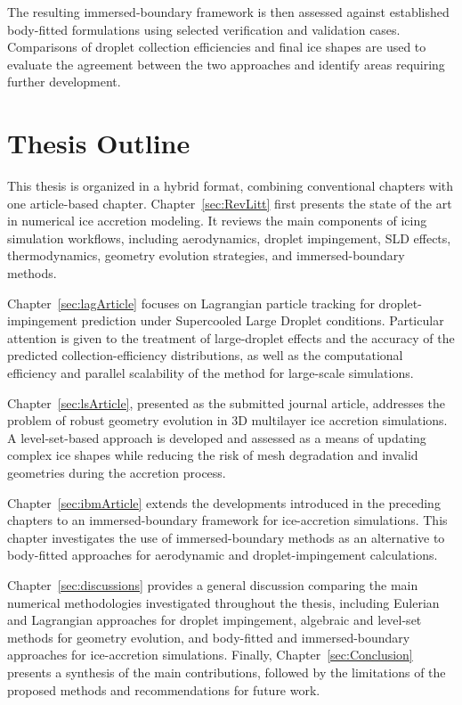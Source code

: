 The resulting immersed-boundary framework is then assessed against established body-fitted formulations using selected verification and validation cases.
Comparisons of droplet collection efficiencies and final ice shapes are used to evaluate the agreement between the two approaches and identify areas requiring further development.

\section{Thesis Outline}

This thesis is organized in a hybrid format, combining conventional chapters with one article-based chapter. Chapter~\ref{sec:RevLitt} first presents the state of the art in numerical ice accretion modeling. It reviews the main components of icing simulation workflows, including aerodynamics, droplet impingement, SLD effects, thermodynamics, geometry evolution strategies, and immersed-boundary methods.

Chapter~\ref{sec:lagArticle} focuses on Lagrangian particle tracking for droplet-impingement prediction under Supercooled Large Droplet conditions. Particular attention is given to the treatment of large-droplet effects and the accuracy of the predicted collection-efficiency distributions, as well as the computational efficiency and parallel scalability of the method for large-scale simulations.

Chapter~\ref{sec:lsArticle}, presented as the submitted journal article, addresses the problem of robust geometry evolution in 3D multilayer ice accretion simulations. A level-set-based approach is developed and assessed as a means of updating complex ice shapes while reducing the risk of mesh degradation and invalid geometries during the accretion process.

Chapter~\ref{sec:ibmArticle} extends the developments introduced in the preceding chapters to an immersed-boundary framework for ice-accretion simulations. This chapter investigates the use of immersed-boundary methods as an alternative to body-fitted approaches for aerodynamic and droplet-impingement calculations.

Chapter~\ref{sec:discussions} provides a general discussion comparing the main numerical methodologies investigated throughout the thesis, including Eulerian and Lagrangian approaches for droplet impingement, algebraic and level-set methods for geometry evolution, and body-fitted and immersed-boundary approaches for ice-accretion simulations. Finally, Chapter~\ref{sec:Conclusion} presents a synthesis of the main contributions, followed by the limitations of the proposed methods and recommendations for future work.
